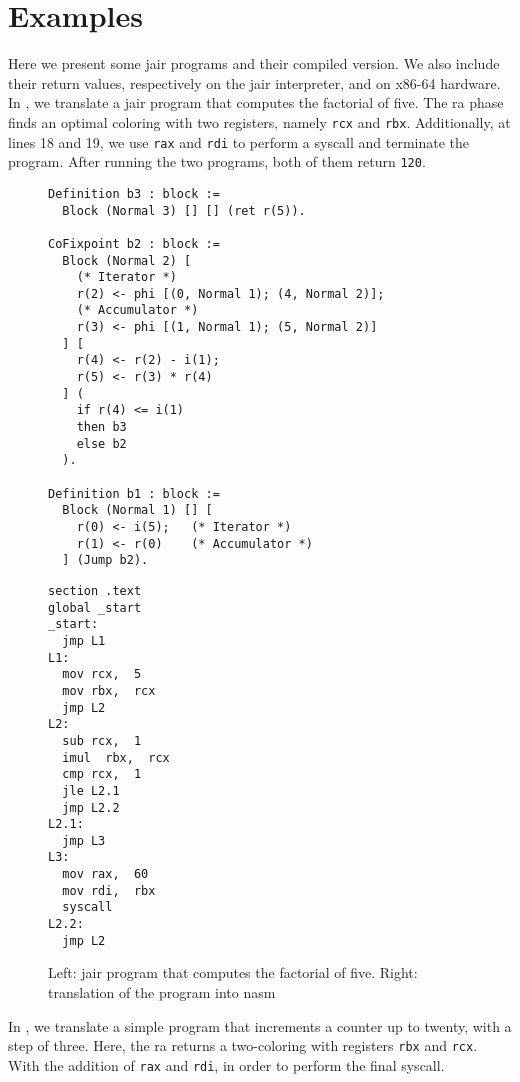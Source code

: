 \section{Examples}
\label{sec:examples}

Here we present some \gls{jair} programs and their compiled version. We also include their return values, respectively on the \gls{jair} interpreter, and on x86-64 hardware.
In , we translate a \gls{jair} program that computes the factorial of five. The \gls{ra} phase finds an optimal coloring with two registers, namely \texttt{rcx} and \texttt{rbx}. Additionally, at lines 18 and 19, we use \texttt{rax} and \texttt{rdi} to perform a syscall and terminate the program. After running the two programs, both of them return \texttt{120}.

\begin{figure}[ht]
\begin{minipage}{0.68\linewidth}
\centering
\begin{lstlisting}[style=Rocq]
Definition b3 : block :=
  Block (Normal 3) [] [] (ret r(5)).

CoFixpoint b2 : block :=
  Block (Normal 2) [
    (* Iterator *)
    r(2) <- phi [(0, Normal 1); (4, Normal 2)];
    (* Accumulator *)
    r(3) <- phi [(1, Normal 1); (5, Normal 2)]
  ] [
    r(4) <- r(2) - i(1);
    r(5) <- r(3) * r(4)
  ] (
    if r(4) <= i(1)
    then b3
    else b2
  ).

Definition b1 : block :=
  Block (Normal 1) [] [
    r(0) <- i(5);   (* Iterator *)
    r(1) <- r(0)    (* Accumulator *)
  ] (Jump b2).
\end{lstlisting}
\end{minipage}
\hfill
\begin{minipage}{0.28\linewidth}
\centering
\begin{lstlisting}[style=NASM]
section .text
global _start
_start:
  jmp L1
L1:
  mov rcx,  5
  mov rbx,  rcx
  jmp L2
L2:
  sub rcx,  1
  imul  rbx,  rcx
  cmp rcx,  1
  jle L2.1
  jmp L2.2
L2.1:
  jmp L3
L3:
  mov rax,  60
  mov rdi,  rbx
  syscall
L2.2:
  jmp L2
\end{lstlisting}
\end{minipage}
\caption{Left: \gls{jair} program that computes the factorial of five. Right: translation of the program into \gls{nasm}}
\label{fig:ex1}
\end{figure}

In , we translate a simple program that increments a counter up to twenty, with a step of three. Here, the \gls{ra} returns a two-coloring with registers \texttt{rbx} and \texttt{rcx}. With the addition of \texttt{rax} and \texttt{rdi}, in order to perform the final syscall.

